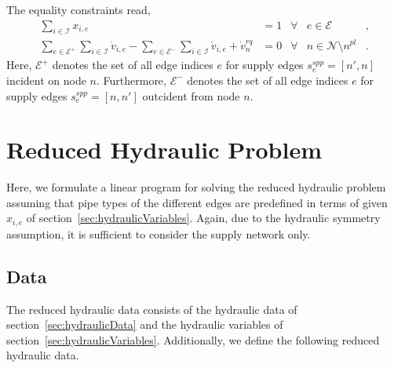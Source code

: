 \documentclass[a4paper,10pt]{article}
\begin{document}
The equality constraints read,
\begin{align}
 \sum_{i\in\mathcal{I}} x_{i,e}&=1&\forall& e\in\mathcal{E} &,\\
 \sum_{e\in \mathcal{E}^+} \sum_{i\in\mathcal{I}} \dot{v}_{i,e} - \sum_{e\in \mathcal{E}^-} \sum_{i\in\mathcal{I}} \dot{v}_{i,e} + \dot{v}_n^{rq} &= 0&\forall& n\in\mathcal{N}\setminus n^{pl} &.
\end{align}
Here, $\mathcal{E}^+$ denotes the set of all edge indices $e$ for supply edges $s_e^{spp}=[n',n]$ incident on node $n$.
Furthermore, $\mathcal{E}^-$ denotes the set of all edge indices $e$ for supply edges $s_e^{spp}=[n,n']$ outcident from node $n$.



\section{Reduced Hydraulic Problem}

Here, we formulate a linear program for solving the reduced hydraulic problem assuming that pipe types of the different edges are predefined in terms of given $x_{i,e}$ of section~\ref{sec:hydraulicVariables}.
Again, due to the hydraulic symmetry assumption, it is sufficient to consider the supply network only.

\subsection{Data}

The reduced hydraulic data consists of the hydraulic data of section~\ref{sec:hydraulicData} and the hydraulic variables of section~\ref{sec:hydraulicVariables}.
Additionally, we define the following reduced hydraulic data.
\end{document}

